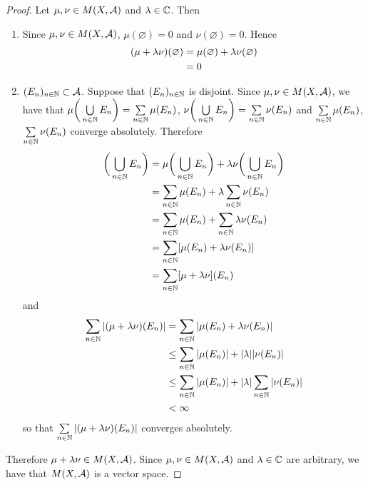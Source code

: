 \documentclass{book}
\begin{document}
	\begin{proof}
		Let $\mu, \nu \in M(X, \mathcal{A})$ and $\lambda \in \mathbb{C}$. Then
		\begin{enumerate}
			\item Since $\mu,\nu \in M(X, \mathcal{A})$, $\mu(\varnothing) = 0$ and $\nu(\varnothing) = 0$. Hence
			\begin{align*}
				(\mu + \lambda \nu)(\varnothing)
				& = \mu(\varnothing) + \lambda \nu(\varnothing) \\
				& = 0
			\end{align*}
			\item $(E_n)_{n \in \mathbb{N}} \subset \mathcal{A}$. Suppose that $(E_n)_{n \in \mathbb{N}}$ is disjoint. Since $\mu,\nu \in M(X, \mathcal{A})$, we have that $\mu \bigg( \bigcup\limits_{n \in \mathbb{N}} E_n \bigg ) = \sum\limits_{n \in \mathbb{N}} \mu(E_n)$, $\nu \bigg( \bigcup\limits_{n \in \mathbb{N}} E_n \bigg) = \sum\limits_{n \in \mathbb{N}} \nu(E_n)$ and  $\sum\limits_{n \in \mathbb{N}} \mu(E_n)$, $\sum\limits_{n \in \mathbb{N}} \nu(E_n)$ converge absolutely. Therefore 
			\begin{align*}
				[\mu + \lam \nu] \bigg(  \bigcup_{n \in \N} E_n \bigg)
				& = \mu \bigg( \bigcup_{n \in \N} E_n \bigg ) + \lam \nu \bigg( \bigcup_{n \in \N} E_n \bigg ) \\
				& = \sum\limits_{n \in \N} \mu(E_n) + \lam \sum\limits_{n \in \N} \nu(E_n) \\
				& = \sum\limits_{n \in \N} \mu(E_n) + \sum\limits_{n \in \N} \lam \nu(E_n) \\
				& = \sum\limits_{n \in \N}  [\mu(E_n)  + \lam \nu(E_n)] \\
				& = \sum\limits_{n \in \N} [\mu + \lam \nu](E_n) \\
			\end{align*}
			and 
			\begin{align*}
				\sum\limits_{n \in \mathbb{N}} | (\mu + \lambda \nu)(E_n) |
				& = \sum\limits_{n \in \mathbb{N}} | \mu(E_n)  + \lambda \nu(E_n) | \\
				& \leq \sum\limits_{n \in \mathbb{N}}  | \mu(E_n) |  + |\lambda| | \nu(E_n) | \\
				& \leq \sum\limits_{n \in \mathbb{N}}  | \mu(E_n) |  + |\lambda|  \sum\limits_{n \in \mathbb{N}} | \nu(E_n) | \\
				& < \infty 
			\end{align*}
			so that $\sum\limits_{n \in \mathbb{N}} | (\mu + \lambda \nu)(E_n) |$ converges absolutely.
		\end{enumerate}
		Therefore $\mu + \lambda \nu \in M(X, \mathcal{A})$. Since $\mu, \nu \in M(X, \mathcal{A})$ and $\lambda \in \mathbb{C}$ are arbitrary, we have that $M(X, \mathcal{A})$ is a vector space.
	\end{proof}
\end{document}
